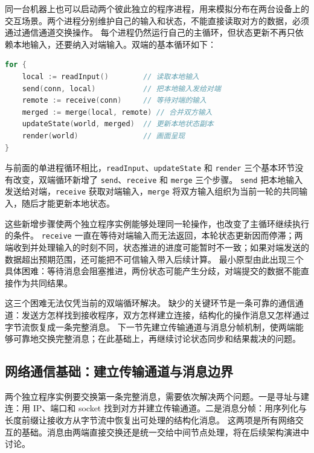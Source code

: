 同一台机器上也可以启动两个彼此独立的程序进程，用来模拟分布在两台设备上的交互场景。两个进程分别维护自己的输入和状态，不能直接读取对方的数据，必须通过通信通道交换操作。
每个进程仍然运行自己的主循环，但状态更新不再只依赖本地输入，还要纳入对端输入。双端的基本循环如下：


\begin{tcolorbox}[title=双进程交互循环（概念示例）]
\begin{lstlisting}[style=codeblock, language=go]
for {
    local := readInput()        // 读取本地输入
    send(conn, local)           // 把本地输入发给对端
    remote := receive(conn)     // 等待对端的输入
    merged := merge(local, remote) // 合并双方输入
    updateState(world, merged)  // 更新本地状态副本
    render(world)               // 画面呈现
}
\end{lstlisting}
\end{tcolorbox}

与前面的单进程循环相比，\texttt{readInput}、\texttt{updateState} 和 \texttt{render} 三个基本环节没有改变，双端循环新增了 \texttt{send}、\texttt{receive} 和 \texttt{merge} 三个步骤。
\texttt{send} 把本地输入发送给对端，\texttt{receive} 获取对端输入，\texttt{merge} 将双方输入组织为当前一轮的共同输入，随后才能更新本地状态。

这些新增步骤使两个独立程序实例能够处理同一轮操作，也改变了主循环继续执行的条件。
\texttt{receive} 一直在等待对端输入而无法返回，本轮状态更新因而停滞；两端收到并处理输入的时刻不同，状态推进的进度可能暂时不一致；如果对端发送的数据超出预期范围，还可能把不可信输入带入后续计算。
最小原型由此出现三个具体困难：等待消息会阻塞推进，两份状态可能产生分歧，对端提交的数据不能直接作为共同结果。

这三个困难无法仅凭当前的双端循环解决。
缺少的关键环节是一条可靠的通信通道：发送方怎样找到接收程序，双方怎样建立连接，结构化的操作消息又怎样通过字节流恢复成一条完整消息。
下一节先建立传输通道与消息分帧机制，使两端能够可靠地交换完整消息；在此基础上，再继续讨论状态同步和结果裁决的问题。

\subsection{网络通信基础：建立传输通道与消息边界}\label{sec2:network-communication-basics}

两个独立程序实例要交换第一条完整消息，需要依次解决两个问题。一是寻址与建连：用 IP、端口和 socket 找到对方并建立传输通道。二是消息分帧：用序列化与长度前缀让接收方从字节流中恢复出可处理的结构化消息。
这两项是所有网络交互的基础。消息由两端直接交换还是统一交给中间节点处理，将在后续架构演进中讨论。

